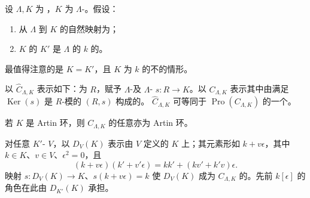 设 $\Lambda,K$ 为 ，$K$ 为 $\Lambda$-。假设：
\begin{enumerate}
\item[(a)] 从 $\Lambda$ 到 $K$ 的自然映射为；
\item[(b)] $K$ 的 $K'$ 是 $\Lambda$ 的 $k$ 的。
\end{enumerate}
最值得注意的是 $K=K'$，且 $K$ 为 $k$ 的不的情形。

以 $\widehat C_{\Lambda,K}$ 表示如下：为  $R$，赋予 $\Lambda$-及 $\Lambda$- $s:R\to K$。以 $C_{\Lambda,K}$ 表示其中由满足 $\operatorname{Ker}(s)$ 是 $R$-模的 $(R,s)$ 构成的。 $\widehat C_{\Lambda,K}$ 可等同于 $\operatorname{Pro}(C_{\Lambda,K})$ 的一个。

若 $K$ 是 Artin 环，则 $C_{\Lambda,K}$ 的任意亦为 Artin 环。

对任意 $K'$- $V$，以 $D_V(K)$ 表示由 $V$ 定义的 $K$ 上；其元素形如 $k+v\epsilon$，其中 $k\in K$、$v\in V$、$\epsilon^2=0$，且
\[(k+v\epsilon)(k'+v'\epsilon)=kk'+(kv'+k'v)\epsilon.\]
映射 $s:D_V(K)\to K$、$s(k+v\epsilon)=k$ 使 $D_V(K)$ 成为 $C_{\Lambda,K}$ 的。先前 $k[\epsilon]$ 的角色在此由 $D_{K'}(K)$ 承担。

